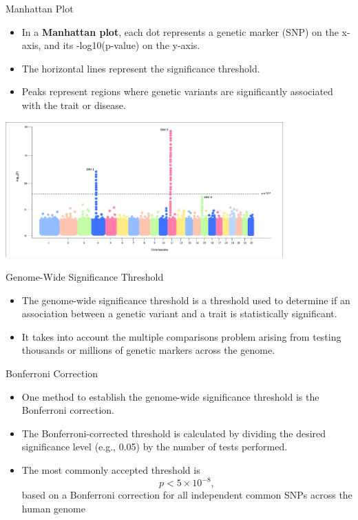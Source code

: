 \documentclass[
  ignorenonframetext,
]{beamer}
\providecommand{\tightlist}{%
  \setlength{\itemsep}{0pt}\setlength{\parskip}{0pt}}
\begin{document}
\begin{frame}{Manhattan Plot}
\label{manhattan-plot}
\begin{itemize}
\tightlist
\item
  In a \textbf{Manhattan plot}, each dot represents a genetic marker
  (SNP) on the x-axis, and its -log10(p-value) on the y-axis.
\item
  The horizontal lines represent the significance threshold.
\item
  Peaks represent regions where genetic variants are significantly
  associated with the trait or disease.
\end{itemize}

\center

\includegraphics[width=0.8\textwidth,height=\textheight]{figs/manhattan.png}
\end{frame}

\begin{frame}{Genome-Wide Significance Threshold}
\label{genome-wide-significance-threshold}
\Large

\begin{itemize}
\tightlist
\item
  The genome-wide significance threshold is a threshold used to
  determine if an association between a genetic variant and a trait is
  statistically significant.
\item
  It takes into account the multiple comparisons problem arising from
  testing thousands or millions of genetic markers across the genome.
\end{itemize}
\end{frame}

\begin{frame}{Bonferroni Correction}
\label{bonferroni-correction}
\Large

\begin{itemize}
\tightlist
\item
  One method to establish the genome-wide significance threshold is the
  Bonferroni correction.
\item
  The Bonferroni-corrected threshold is calculated by dividing the
  desired significance level (e.g., 0.05) by the number of tests
  performed.
\item
  The most commonly accepted threshold is \[p < 5\times 10^{-8},\] based
  on a Bonferroni correction for all independent common SNPs across the
  human genome
\end{itemize}
\end{frame}
\end{document}
